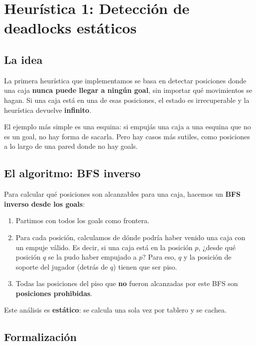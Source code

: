 \documentclass[12pt, a4paper]{article}
\begin{document}
\section{Heurística 1: Detección de deadlocks estáticos}

\subsection{La idea}

La primera heurística que implementamos se basa en detectar posiciones donde una caja \textbf{nunca puede llegar a ningún goal}, sin importar qué movimientos se hagan. Si una caja está en una de esas posiciones, el estado es irrecuperable y la heurística devuelve \textbf{infinito}.

El ejemplo más simple es una esquina: si empujás una caja a una esquina que no es un goal, no hay forma de sacarla. Pero hay casos más sutiles, como posiciones a lo largo de una pared donde no hay goals.

\subsection{El algoritmo: BFS inverso}

Para calcular qué posiciones son alcanzables para una caja, hacemos un \textbf{BFS inverso desde los goals}:

\begin{enumerate}
  \item Partimos con todos los goals como frontera.
  \item Para cada posición, calculamos de dónde podría haber venido una caja con un empuje válido. Es decir, si una caja está en la posición $p$, ¿desde qué posición $q$ se la pudo haber empujado a $p$? Para eso, $q$ y la posición de soporte del jugador (detrás de $q$) tienen que ser piso.
  \item Todas las posiciones del piso que \textbf{no} fueron alcanzadas por este BFS son \textbf{posiciones prohibidas}.
\end{enumerate}

Este análisis es \textbf{estático}: se calcula una sola vez por tablero y se cachea.

\subsection{Formalización}
\end{document}
